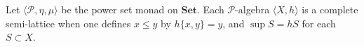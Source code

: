 Let $\langle \mathcal{P}, \eta, \mu \rangle$ be the power set monad on $\mathbf{Set}$. Each $\mathcal{P}$-algebra $\langle X, h \rangle$ is a complete semi-lattice when one defines $x \leq y$ by $h\{x, y\} = y$, and $\sup S = hS$ for each $S \subset X$.
